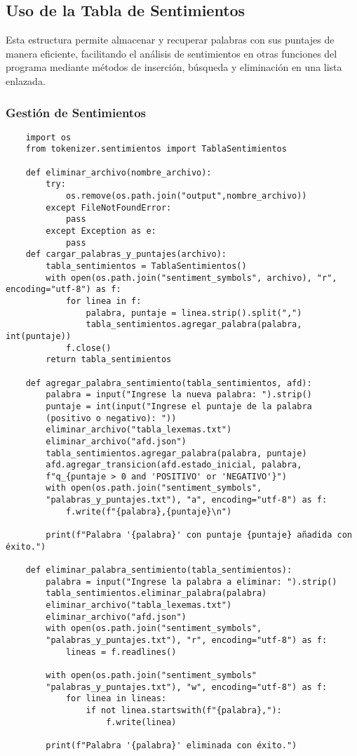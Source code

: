 \documentclass[12pt,a4paper]{article}
\begin{document}
\subsection*{Uso de la Tabla de Sentimientos}
Esta estructura permite almacenar y recuperar palabras con sus puntajes de manera eficiente,
facilitando el análisis de sentimientos en otras funciones del programa mediante métodos de
inserción, búsqueda y eliminación en una lista enlazada.

\subsubsection{Gestión de Sentimientos}

\begin{verbatim}
    import os
    from tokenizer.sentimientos import TablaSentimientos
    
    def eliminar_archivo(nombre_archivo):
        try:
            os.remove(os.path.join("output",nombre_archivo))
        except FileNotFoundError:
            pass
        except Exception as e:
            pass
    def cargar_palabras_y_puntajes(archivo):
        tabla_sentimientos = TablaSentimientos()
        with open(os.path.join("sentiment_symbols", archivo), "r", encoding="utf-8") as f:
            for linea in f:
                palabra, puntaje = linea.strip().split(",")
                tabla_sentimientos.agregar_palabra(palabra, int(puntaje))
            f.close()    
        return tabla_sentimientos
    
    def agregar_palabra_sentimiento(tabla_sentimientos, afd):
        palabra = input("Ingrese la nueva palabra: ").strip()
        puntaje = int(input("Ingrese el puntaje de la palabra 
        (positivo o negativo): "))
        eliminar_archivo("tabla_lexemas.txt")
        eliminar_archivo("afd.json")    
        tabla_sentimientos.agregar_palabra(palabra, puntaje)        
        afd.agregar_transicion(afd.estado_inicial, palabra, 
        f"q_{puntaje > 0 and 'POSITIVO' or 'NEGATIVO'}")        
        with open(os.path.join("sentiment_symbols",
        "palabras_y_puntajes.txt"), "a", encoding="utf-8") as f:
            f.write(f"{palabra},{puntaje}\n")
        
        print(f"Palabra '{palabra}' con puntaje {puntaje} añadida con éxito.")
    
    def eliminar_palabra_sentimiento(tabla_sentimientos):
        palabra = input("Ingrese la palabra a eliminar: ").strip()
        tabla_sentimientos.eliminar_palabra(palabra)
        eliminar_archivo("tabla_lexemas.txt")
        eliminar_archivo("afd.json")
        with open(os.path.join("sentiment_symbols",
        "palabras_y_puntajes.txt"), "r", encoding="utf-8") as f:
            lineas = f.readlines()
        
        with open(os.path.join("sentiment_symbols"
        "palabras_y_puntajes.txt"), "w", encoding="utf-8") as f:
            for linea in lineas:
                if not linea.startswith(f"{palabra},"):
                    f.write(linea)
    
        print(f"Palabra '{palabra}' eliminada con éxito.")
        
\end{verbatim}
\end{document}
